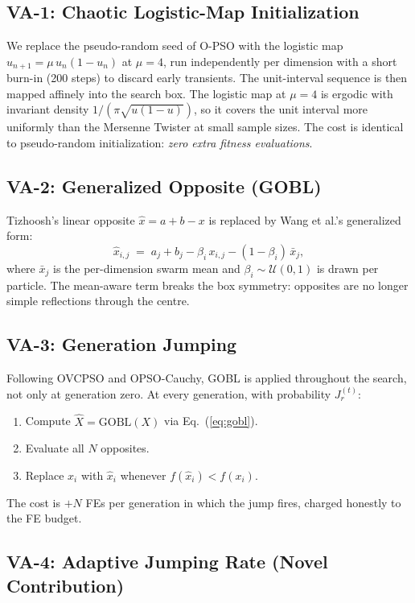 \documentclass[11pt,a4paper]{article}
\newcommand{\opso}{O-PSO}
\newcommand{\jrt}{J_{r}^{(t)}}
\begin{document}
\subsection{VA-1: Chaotic Logistic-Map Initialization}

We replace the pseudo-random seed of \opso{} with the logistic map
$u_{n+1} = \mu \, u_n(1-u_n)$ at $\mu=4$, run independently per dimension
with a short burn-in (200 steps) to discard early transients. The unit-interval
sequence is then mapped affinely into the search box. The logistic map at
$\mu=4$ is ergodic with invariant density $1/(\pi\sqrt{u(1-u)})$, so it
covers the unit interval more uniformly than the Mersenne Twister at small
sample sizes. The cost is identical to pseudo-random initialization:
\emph{zero extra fitness evaluations}.

\subsection{VA-2: Generalized Opposite (GOBL)}

Tizhoosh's linear opposite $\hat{x}=a+b-x$ is replaced by Wang et al.'s
generalized form:
\begin{equation}
\hat{x}_{i,j} \;=\; a_j + b_j - \beta_i \, x_{i,j} - (1-\beta_i)\, \bar{x}_j,
\label{eq:gobl}
\end{equation}
where $\bar{x}_j$ is the per-dimension swarm mean and
$\beta_i\sim\mathcal{U}(0,1)$ is drawn per particle. The mean-aware term
breaks the box symmetry: opposites are no longer simple reflections through
the centre.

\subsection{VA-3: Generation Jumping}

Following OVCPSO and OPSO-Cauchy, GOBL is applied throughout the search,
not only at generation zero. At every generation, with probability $\jrt$:
\begin{enumerate}
  \item Compute $\hat{X} = \mathrm{GOBL}(X)$ via Eq.~(\ref{eq:gobl}).
  \item Evaluate all $N$ opposites.
  \item Replace $x_i$ with $\hat{x}_i$ whenever $f(\hat{x}_i) < f(x_i)$.
\end{enumerate}
The cost is $+N$ FEs per generation in which the jump fires, charged
honestly to the FE budget.

\subsection{VA-4: Adaptive Jumping Rate (Novel Contribution)}
\end{document}
